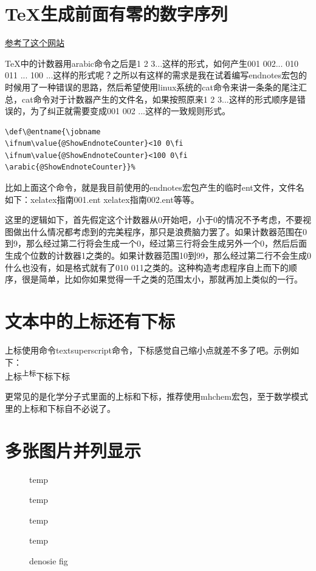 \documentclass[12pt,oneside]{book}
\begin{document}
\begin{common-format}
\section{TeX生成前面有零的数字序列}
\href{http://tex.stackexchange.com/questions/30930/how-to-output-a-counter-with-leading-zeros}{参考了这个网站}

TeX中的计数器用arabic命令之后是1 2 3...这样的形式，如何产生001 002... 010 011 ... 100 ...这样的形式呢？之所以有这样的需求是我在试着编写endnotes宏包的时候用了一种错误的思路，然后希望使用linux系统的cat命令来讲一条条的尾注汇总，cat命令对于计数器产生的文件名，如果按照原来1 2 3...这样的形式顺序是错误的，为了纠正就需要变成001  002 ...这样的一致规则形式。

\begin{Verbatim}
\def\@entname{\jobname
\ifnum\value{@ShowEndnoteCounter}<10 0\fi
\ifnum\value{@ShowEndnoteCounter}<100 0\fi
\arabic{@ShowEndnoteCounter}}%
\end{Verbatim}

比如上面这个命令，就是我目前使用的endnotes宏包产生的临时ent文件，文件名如下：xelatex指南001.ent xelatex指南002.ent等等。

这里的逻辑如下，首先假定这个计数器从0开始吧，小于0的情况不予考虑，不要视图做出什么情况都考虑到的完美程序，那只是浪费脑力罢了。如果计数器范围在0到9，那么经过第二行将会生成一个0，经过第三行将会生成另外一个0，然后后面生成个位数的计数器1之类的。如果计数器范围10到99，那么经过第二行不会生成0什么也没有，如是格式就有了010 011之类的。这种构造考虑程序自上而下的顺序，很是简单，比如你如果觉得一千之类的范围太小，那就再加上类似的一行。



\section{文本中的上标还有下标}
上标使用命令textsuperscript命令，下标感觉自己缩小点就差不多了吧。示例如下：\\
上标\textsuperscript{上标}下标{\scriptsize 下标}

更常见的是化学分子式里面的上标和下标，推荐使用mhchem宏包，至于数学模式里的上标和下标自不必说了。


\section{多张图片并列显示}
\label{sec:多张图片并列显示}

\begin{figure}[H]
\label{fig:四栏图片}
\begin{multicols}{4}
\begin{linefig}{temp}
\end{linefig}
\begin{linefig}{temp}
\end{linefig}
\begin{linefig}{temp}
\end{linefig}
\begin{linefig}{temp}
\end{linefig}
\end{multicols}
\caption{denosie fig}
\label{fig:denosie fig}
\end{figure}


\end{common-format}
\end{document}
